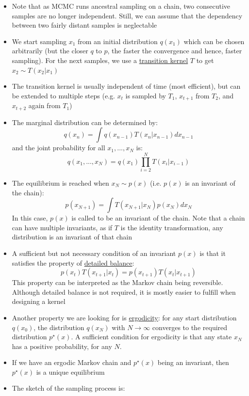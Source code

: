 \begin{itemize}
\begin{figure}[ht!]
{			;
			;
			;
			;
			;
			;
		}
	\end{figure}
	\item Note that as MCMC runs ancestral sampling on a chain, two consecutive samples are no longer independent. Still, we can assume that the dependency between two fairly distant samples is neglectable
	\item We start sampling $x_1$ from an initial distribution $q(x_1)$ which can be chosen arbitrarily (but the closer $q$ to $p$, the faster the convergence and hence, faster sampling). For the next samples, we use a \underline{transition kernel} $T$ to get $x_2\sim T(x_2|x_1)$
	\item The transition kernel is usually independent of time (most efficient), but can be extended to multiple steps (e.g. $x_t$ is sampled by $T_1$, $x_{t+1}$ from $T_2$, and $x_{t+2}$ again from $T_1$)
	\item The marginal distribution can be determined by:
	$$q(x_{n}) = \int q(x_{n-1})T(x_{n}|x_{n-1})dx_{n-1}$$
	and the joint probability for all $x_1,...,x_N$ is:
	$$q(x_1,...,x_N) = q(x_1)\prod_{i=2}^{N}T(x_i|x_{i-1})$$
	\item The equilibrium is reached when $x_N\sim p(x)$ (i.e. $p(x)$ is an invariant of the chain):
	$$p(x_{N+1}) = \int T(x_{N+1}|x_N)p(x_N)dx_N$$ 
	In this case, $p(x)$ is called to be an invariant of the chain. Note that a chain can have multiple invariants, as if $T$ is the identity transformation, any distribution is an invariant of that chain
	\item A sufficient but not necessary condition of an invariant $p(x)$ is that it satisfies the property of \underline{detailed balance}:
	$$p(x_t)T(x_{t+1}|x_t) = p(x_{t+1})T(x_t|x_{t+1})$$
	This property can be interpreted as the Markov chain being reversible. Although detailed balance is not required, it is mostly easier to fulfill when designing a kernel
	\item Another property we are looking for is \underline{ergodicity}: for any start distribution $q(x_0)$, the distribution $q(x_N)$ with $N\to\infty$ converges to the required distribution $p^{\star}(x)$. A sufficient condition for ergodicity is that any state $x_N$ has a positive probability, for any $N$.
	\item If we have an ergodic Markov chain and $p^{\star}(x)$ being an invariant, then $p^{\star}(x)$ is a unique equilibrium
	\item The sketch of the sampling process is:
	

\end{itemize}
